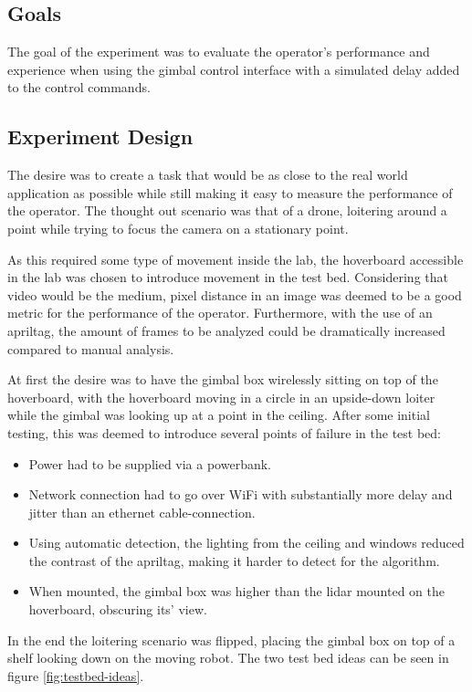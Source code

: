 \documentclass[nofilelist]{cslthse-msc}
\begin{document}
\subsection{Goals}
The goal of the experiment was to evaluate the operator's performance and experience when using the gimbal control interface with a simulated delay added to the control commands.

\subsection{Experiment Design}
The desire was to create a task that would be as close to the real world application as possible while still making it easy to measure the performance of the operator. The thought out scenario was that of a drone, loitering around a point while trying to focus the camera on a stationary point. 

As this required some type of movement inside the lab, the hoverboard accessible in the lab was chosen to introduce movement in the test bed. Considering that video would be the medium, pixel distance in an image was deemed to be a good metric for the performance of the operator. Furthermore, with the use of an apriltag, the amount of frames to be analyzed could be dramatically increased compared to manual analysis.

At first the desire was to have the gimbal box wirelessly sitting on top of the hoverboard, with the hoverboard moving in a circle in an upside-down loiter while the gimbal was looking up at a point in the ceiling. After some initial testing, this was deemed to introduce several points of failure in the test bed:

\begin{itemize}
   \item Power had to be supplied via a powerbank.
   \item Network connection had to go over WiFi with substantially more delay and jitter than an ethernet cable-connection. 
   \item Using automatic detection, the lighting from the ceiling and windows reduced the contrast of the apriltag, making it harder to detect for the algorithm.
   \item When mounted, the gimbal box was higher than the lidar mounted on the hoverboard, obscuring its' view.
\end{itemize}

In the end the loitering scenario was flipped, placing the gimbal box on top of a shelf looking down on the moving robot. The two test bed ideas can be seen in figure \ref{fig:testbed-ideas}.
\end{document}
